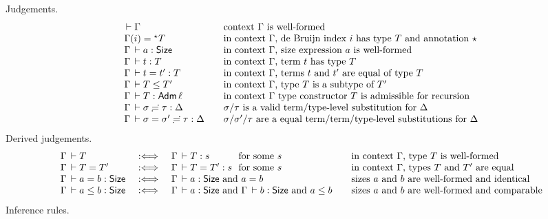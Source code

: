 \documentclass[acmlarge,review,anonymous]{acmart}\settopmatter{printfolios=true}
\begin{document}
Judgements.
\[
\begin{array}{l@{\qquad}l}
  \der \Gamma & \mbox{context $\Gamma$ is well-formed} \\
  \Gamma(i) = \eann T & \mbox{in context $\Gamma$, de Bruijn index $i$ has type $T$ and annotation $\evar$} \\
  \Gamma \der a : \Size & \mbox{in context $\Gamma$, size expression $a$ is well-formed} \\
  \Gamma \der t : T & \mbox{in context $\Gamma$, term $t$ has type $T$} \\
  \Gamma \der t = t' : T & \mbox{in context $\Gamma$, terms $t$ and $t'$ are equal of type $T$} \\
  \Gamma \der T \leq T' & \mbox{in context $\Gamma$, type $T$ is a subtype of $T'$} \\
  \Gamma \der T : \Adm \ell & \mbox{in context $\Gamma$ type constructor $T$ is admissible for recursion} \\
  \suty \Gamma \sigma \tau \Delta & \mbox{$\sigma$/$\tau$ is a valid term/type-level substitution for $\Delta$} \\
  \sueq \Gamma \sigma {\sigma'} \tau \Delta & \mbox{$\sigma$/$\sigma'$/$\tau$ are a equal term/term/type-level substitutions for $\Delta$} \\
\end{array}
\]
Derived judgements.
\[
\begin{array}{lll@{~}l@{\qquad}l}
  \Gamma \der T & \defas & \Gamma \der T : s & \mforsome s
    & \mbox{in context $\Gamma$, type $T$ is well-formed} \\
  \Gamma \der T = T' & \defas & \Gamma \der T = T' : s & \mforsome s
    & \mbox{in context $\Gamma$, types $T$ and $T'$ are equal} \\
  \Gamma \der a = b : \Size & \defas & \multicolumn 2 {l@{\qquad}} {\Gamma \der a : \Size \mand a = b}
    & \mbox{sizes $a$ and $b$ are well-formed and identical} \\
  \Gamma \der a \leq b : \Size & \defas &
     \multicolumn 2 {l@{\qquad}} {\Gamma \der a : \Size \mand \Gamma \der b : \Size \mand a \leq b}
    & \mbox{sizes $a$ and $b$ are well-formed and comparable} \\
\end{array}
\]
Inference rules.
\end{document}
